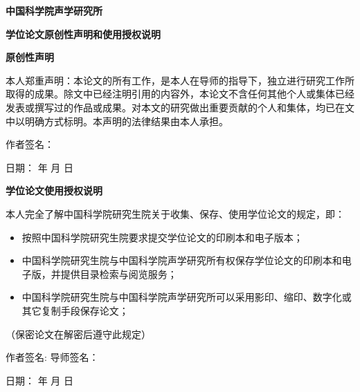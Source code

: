 
\newpage
\thispagestyle{empty}

\begin{center}
   \xiaosan\textbf{中国科学院声学研究所}

    \textbf{学位论文原创性声明和使用授权说明}
\end{center}
\begin{center}
    \vspace{5mm}
    \sihao\textbf{ 原创性声明}
    \vspace{5mm}
\end{center}
\hspace{9mm}本人郑重声明：本论文的所有工作，是本人在导师的指导下，独立进行研究工作所取得的成果。除文中已经注明引用的内容外，本论文不含任何其他个人或集体已经发表或撰写过的作品或成果。对本文的研究做出重要贡献的个人和集体，均已在文中以明确方式标明。本声明的法律结果由本人承担。

\begin{flushright}
   \vspace{7mm}
   作者签名：\hspace{10em}

    日期：\hspace{4em} 年 \hspace{2em} 月 \hspace{2em}日
\end{flushright}
\begin{center}
    \vspace{5mm}
    \sihao\textbf{ 学位论文使用授权说明}
    \vspace{5mm}
\end{center}
\hspace{9mm}本人完全了解中国科学院研究生院关于收集、保存、使用学位论文的规定，即：
\begin{itemize}
    \item  按照中国科学院研究生院要求提交学位论文的印刷本和电子版本；
    \item  中国科学院研究生院与中国科学院声学研究所有权保存学位论文的印刷本和电子版，并提供目录检索与阅览服务；
    \item  中国科学院研究生院与中国科学院声学研究所可以采用影印、缩印、数字化或其它复制手段保存论文；
\end{itemize}
\begin{center}
    （保密论文在解密后遵守此规定）
\end{center}
\begin{flushright}
    \vspace{7mm}
    作者签名:\hspace{5em} 导师签名：\hspace{8em}

   日期：\hspace{4em} 年 \hspace{2em} 月 \hspace{2em}日
\end{flushright}
